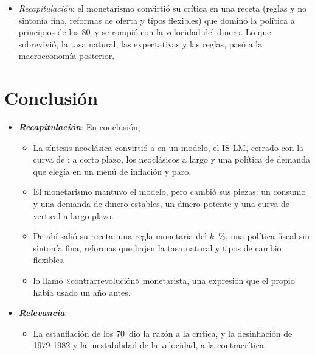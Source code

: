 \documentclass[11pt]{article}
\begin{document}
\begin{itemize}
\item \emph{Recapitulación}: el monetarismo convirtió su crítica en una receta (reglas y no sintonía fina, reformas de oferta y tipos flexibles) que dominó la política a principios de los 80~y se rompió con la velocidad del dinero. Lo que sobrevivió, la tasa natural, las expectativas y las reglas, pasó a la macroeconomía posterior.
\end{itemize}


\section*{Conclusión}

\begin{itemize}
\item \textbf{\emph{Recapitulación}}: En conclusión,
  \begin{itemize}
  \item La síntesis neoclásica convirtió a  en un modelo, el IS-LM, cerrado con la curva de :  a corto plazo, los neoclásicos a largo y una política de demanda que elegía en un menú de inflación y paro.

  \item El monetarismo mantuvo el modelo, pero cambió sus piezas: un consumo y una demanda de dinero estables, un dinero potente y una curva de  vertical a largo plazo.

  \item De ahí salió su receta: una regla monetaria del $k$~\%, una política fiscal sin sintonía fina, reformas que bajen la tasa natural y tipos de cambio flexibles.

  \item {} lo llamó «contrarrevolución» monetarista\nocite{Johnson1971Keynesian}, una expresión que el propio \textcite{Friedman1970Counter} había usado un año antes.
  \end{itemize}
\item \textbf{\emph{Relevancia}}:
  \begin{itemize}
  \item La estanflación de los 70~dio la razón a la crítica, y la desinflación de 1979-1982 y la inestabilidad de la velocidad, a la contracrítica.


\end{itemize}
\end{itemize}
\end{document}
